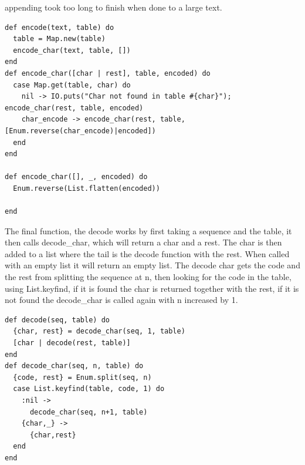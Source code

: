 \documentclass[a4paper,11pt]{article}
\begin{document}
appending took too long to finish when done to a large text. 
\begin{verbatim}
def encode(text, table) do
  table = Map.new(table)
  encode_char(text, table, [])
end
def encode_char([char | rest], table, encoded) do
  case Map.get(table, char) do
    nil -> IO.puts("Char not found in table #{char}"); encode_char(rest, table, encoded)
    char_encode -> encode_char(rest, table, [Enum.reverse(char_encode)|encoded])
  end
end

def encode_char([], _, encoded) do
  Enum.reverse(List.flatten(encoded))

end
\end{verbatim}
The final function, the decode works by first taking a sequence and the table, it then calls decode\_char, which will return a char and a rest. The char is then added to a list where the tail is the decode function with the rest. When called with an empty list it will return an empty list. 
The decode char gets the code and the rest from splitting the sequence at n, then looking for the code in the table, using List.keyfind, if it is found the char is returned together with the rest, if it is not found the decode\_char is called again with n increased by 1.
\begin{verbatim}
def decode(seq, table) do
  {char, rest} = decode_char(seq, 1, table)
  [char | decode(rest, table)]
end
def decode_char(seq, n, table) do
  {code, rest} = Enum.split(seq, n)
  case List.keyfind(table, code, 1) do
    :nil ->
      decode_char(seq, n+1, table)
    {char,_} ->
      {char,rest}
  end
end
\end{verbatim}
\end{document}

